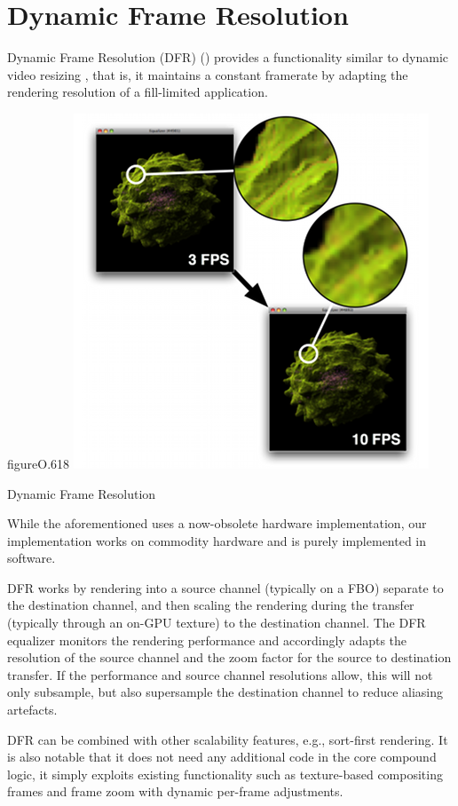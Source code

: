 \section{Dynamic Frame Resolution}


Dynamic Frame Resolution (DFR) () provides a functionality similar to
dynamic video resizing \cite{MBDM:97}, that is, it maintains a constant
framerate by adapting the rendering resolution of a fill-limited application.

\begin{wrapfloat}{figure}{O}{.618\textwidth}
  \includegraphics[width=.618\textwidth]{images/dfr}
  \caption{\label{fdfr}Dynamic Frame Resolution}
\end{wrapfloat}

While the aforementioned uses a now-obsolete hardware implementation, our
implementation works on commodity hardware and is purely implemented in
software.

DFR works by rendering into a source channel (typically on a FBO) separate to
the destination channel, and then scaling the rendering during the transfer
(typically through an on-GPU texture) to the destination channel. The DFR
equalizer monitors the rendering performance and accordingly adapts the
resolution of the source channel and the zoom factor for the source to
destination transfer. If the performance and source channel resolutions allow,
this will not only subsample, but also supersample the destination channel to
reduce aliasing artefacts.

DFR can be combined with other scalability features, e.g., sort-first
rendering. It is also notable that it does not need any additional code in the
core compound logic, it simply exploits existing functionality such as
texture-based compositing frames and frame zoom with dynamic per-frame
adjustments.

